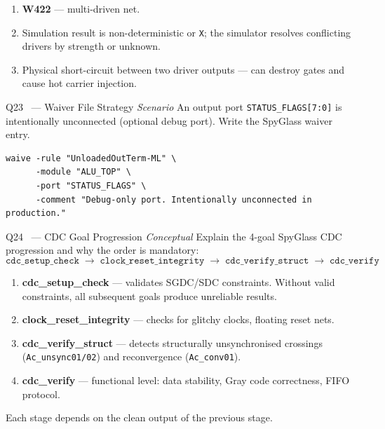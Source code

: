 \documentclass[12pt,a4paper]{article}
\newcommand{\advanced}{%
  \fbox{\textcolor{advred}{\bfseries\sffamily\small ADVANCED}}}
\begin{document}
\begin{answerbox}
\begin{enumerate}[label=\textbf{\alph*)}]
  \item \textbf{W422} --- multi-driven net.
  \item Simulation result is non-deterministic or \texttt{X}; the simulator resolves conflicting drivers by strength or unknown.
  \item Physical short-circuit between two driver outputs --- can destroy gates and cause hot carrier injection.
\end{enumerate}
\end{answerbox}

\begin{questionbox}{Q23 \advanced\ --- Waiver File Strategy \hfill\textit{Scenario}}
An output port \texttt{STATUS\_FLAGS[7:0]} is intentionally unconnected (optional debug port). Write the SpyGlass waiver entry.
\end{questionbox}

\begin{answerbox}
\begin{lstlisting}[style=tclstyle]
waive -rule "UnloadedOutTerm-ML" \
      -module "ALU_TOP" \
      -port "STATUS_FLAGS" \
      -comment "Debug-only port. Intentionally unconnected in production."
\end{lstlisting}
\end{answerbox}

\begin{questionbox}{Q24 \advanced\ --- CDC Goal Progression \hfill\textit{Conceptual}}
Explain the 4-goal SpyGlass CDC progression and why the order is mandatory:
\[
\texttt{cdc\_setup\_check} \;\to\; \texttt{clock\_reset\_integrity} \;\to\; \texttt{cdc\_verify\_struct} \;\to\; \texttt{cdc\_verify}
\]
\end{questionbox}

\begin{answerbox}
\begin{enumerate}
  \item \textbf{cdc\_setup\_check} --- validates SGDC/SDC constraints. Without valid constraints, all subsequent goals produce unreliable results.
  \item \textbf{clock\_reset\_integrity} --- checks for glitchy clocks, floating reset nets.
  \item \textbf{cdc\_verify\_struct} --- detects structurally unsynchronised crossings (\texttt{Ac\_unsync01/02}) and reconvergence (\texttt{Ac\_conv01}).
  \item \textbf{cdc\_verify} --- functional level: data stability, Gray code correctness, FIFO protocol.
\end{enumerate}
Each stage depends on the clean output of the previous stage.
\end{answerbox}
\end{document}
